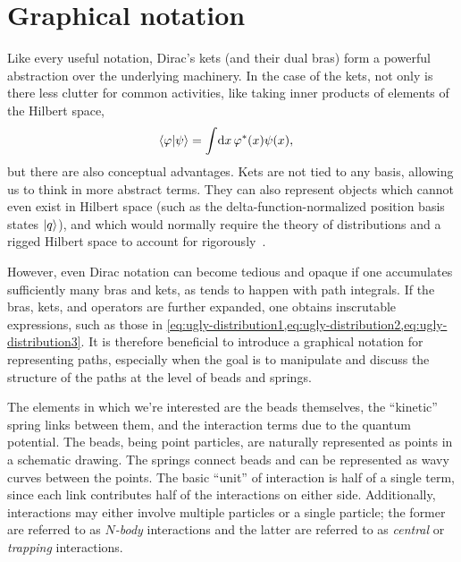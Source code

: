 \section{Graphical notation}

\label{sec:graphical}

Like every useful notation, Dirac's kets (and their dual bras) form a powerful abstraction over the underlying machinery.
In the case of the kets, not only is there less clutter for common activities, like taking inner products of elements of the Hilbert space,
\begin{align}
	\braket{\phi | \psi}
	&= \int\! \dif x \, \phi\conj(x) \psi(x),
\end{align}
but there are also conceptual advantages.
Kets are not tied to any basis, allowing us to think in more abstract terms.
They can also represent objects which cannot even exist in Hilbert space (such as the delta-function-normalized position basis states $\ket{q}$), and which would normally require the theory of distributions and a rigged Hilbert space to account for rigorously~\cite{de2005role}.

However, even Dirac notation can become tedious and opaque if one accumulates sufficiently many bras and kets, as tends to happen with path integrals.
If the bras, kets, and operators are further expanded, one obtains inscrutable expressions, such as those in \cref{eq:ugly-distribution1,eq:ugly-distribution2,eq:ugly-distribution3}.
It is therefore beneficial to introduce a graphical notation for representing paths, especially when the goal is to manipulate and discuss the structure of the paths at the level of beads and springs.

The elements in which we're interested are the beads themselves, the ``kinetic'' spring links between them, and the interaction terms due to the quantum potential.
The beads, being point particles, are naturally represented as points in a schematic drawing.
The springs connect beads and can be represented as wavy curves between the points.
The basic ``unit'' of interaction is half of a single term, since each link contributes half of the interactions on either side.
Additionally, interactions may either involve multiple particles or a single particle; the former are referred to as \emph{$N$-body} interactions and the latter are referred to as \emph{central} or \emph{trapping} interactions.

